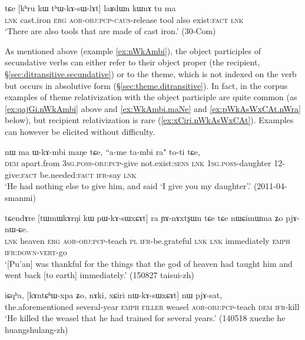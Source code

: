 \begin{exe}
\ex \label{ex:khru.kW.thWkAsWlAt}
\gll tɕe [kʰru kɯ tʰɯ-kɤ-sɯ-lɤt] laʁdɯn kɯnɤ tu ma\\
\textsc{lnk} cast.iron \textsc{erg} \textsc{aor}-\textsc{obj}:\textsc{pcp}-\textsc{caus}-release tool also exist:\textsc{fact} \textsc{lnk}\\
\glt `There are also tools that are made of cast iron.' (30-Com)
\end{exe}

As mentioned above (example \ref{ex:nWkAmbi}), the object participles of secundative verbs can either refer to their object proper (the recipient, §\ref{sec:ditransitive.secundative}) or to the theme, which is not indexed on the verb but occurs in absolutive form (§\ref{sec:theme.ditransitive}). In fact, in the corpus examples of theme relativization with the object participle are quite common (as \ref{ex:qajGi.nWkAmbi} above and \ref{ex:WkAmbi.maNe} and \ref{ex:pWkAsWxCAt.nWra} below), but recipient relativization is rare (\ref{ex:xCiri.nWkAsWxCAt}). Examples can however be elicited without difficulty.

\begin{exe}
\ex \label{ex:WkAmbi.maNe}
\gll nɯ ma ɯ-kɤ-mbi maŋe tɕe, ``a-me ta-mbi ra" to-ti tɕe, \\
\textsc{dem} apart.from \textsc{3sg}.\textsc{poss}-\textsc{obj}:\textsc{pcp}-give not.exist:\textsc{sens} \textsc{lnk} \textsc{1sg}.\textsc{poss}-daughter 1\fl{}2-give:\textsc{fact}  be.needed:\textsc{fact} \textsc{ifr}-say \textsc{lnk} \\
\glt `He had nothing else to give him, and said `I give you my daughter'.' (2011-04-smanmi)
\end{exe}

\begin{exe}
\ex \label{ex:pWkAsWxCAt.nWra}
\gll   tɕendɤre [tɯmɯkɤrŋi kɯ pɯ-kɤ-sɯxɕɤt] ra ɲɤ-nɤxtʂɯn tɕe tɕe nɯɕimɯma ʑo pjɤ-nɯ-ɕe. \\
\textsc{lnk} heaven \textsc{erg} \textsc{aor}-\textsc{obj}:\textsc{pcp}-teach \textsc{pl} \textsc{ifr}-be.grateful \textsc{lnk} \textsc{lnk} immediately \textsc{emph} \textsc{ifr}:\textsc{down}-\textsc{vert}-go \\
\glt `[Pu'an] was thankful for the things that the god of heaven had taught him and went back [to earth] immediately.' (150827 taisui-zh)
\end{exe}

\begin{exe}
\ex \label{ex:xCiri.nWkAsWxCAt}
\gll    iɕqʰa, [kɤntɕʰɯ-xpa ʑo, nɤki, xɕiri nɯ-kɤ-sɯxɕɤt] nɯ pjɤ-sat, \\
 the.aforementioned several-year \textsc{emph} \textsc{filler} weasel \textsc{aor}-\textsc{obj}:\textsc{pcp}-teach \textsc{dem} \textsc{ifr}-kill \\
\glt `He killed the weasel that he had trained for several years.'  (140518 xuezhe he huangshulang-zh)
\end{exe}

